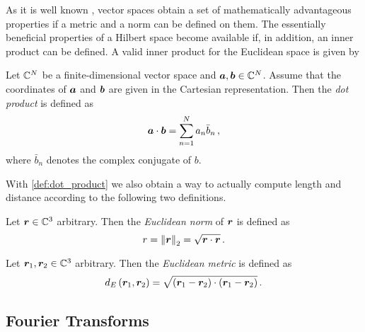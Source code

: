 As it is well known \cite{heuser2006}, vector spaces obtain a set of
mathematically advantageous properties if a metric and a norm can be defined on
them.
The essentially beneficial properties of a Hilbert space become available if,
in addition, an inner product can be defined.
A valid inner product for the Euclidean space is given by
\begin{definition}\label{def:dot_product}
	Let $\mathbb{C}^N$ be a finite-dimensional vector space and
	$\pvec{a}, \pvec{b} \in \C^N$.
	Assume that the coordinates of $\pvec{a}$ and $\pvec{b}$ are given in
	the Cartesian representation.
	Then the \emph{dot product}
	is defined as 
	\begin{equation}
		\pvec{a} \cdot \pvec{b} = \sum\limits_{n = 1}^{N} a_n \bar{b}_n \, ,
	\end{equation}
	where $\bar{b}_n$ denotes the complex conjugate of $b$.
\end{definition}

With \cref{def:dot_product} we also obtain a way to actually compute length
and distance according to the following two definitions.
\begin{definition}\label{def:euclidean_norm}
	Let $\pvec{r} \in \C^3$ arbitrary. Then the \emph{Euclidean norm} of
	$\pvec{r}$ is defined as
	\begin{equation}
		r = \euclideanNorm{\pvec{r}} = \sqrt{\pvec{r} \cdot \pvec{r}} \, .
	\end{equation}
\end{definition}
\begin{definition}\label{def:euclidean_metric}
	Let $\pvec{r}_1, \pvec{r}_2 \in \C^3$ arbitrary. Then the \emph{Euclidean
	metric} is defined as
	\begin{equation}
		d_E\left(\pvec{r}_1 , \pvec{r}_2\right) = 
		\sqrt{
			\left(\pvec{r}_1 - \pvec{r}_2\right)
			\cdot
			\left(\pvec{r}_1 - \pvec{r}_2\right)
		} \, .
	\end{equation}
\end{definition}





\subsection{Fourier Transforms}

